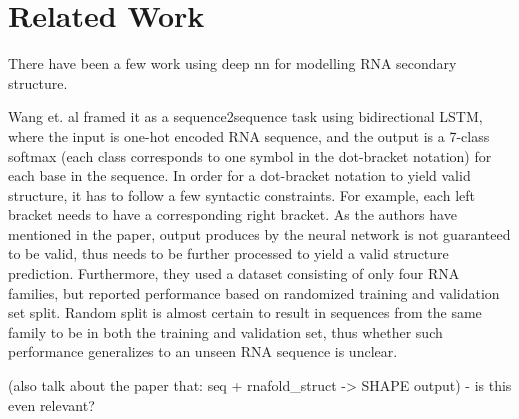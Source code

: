 \documentclass{article}
\begin{document}

\section{Related Work}

There have been a few work using deep nn for modelling RNA secondary structure.

Wang et. al\cite{wang2019dmfold} framed it as a sequence2sequence task using bidirectional LSTM,
where the input is one-hot encoded RNA sequence, and the output is a
7-class softmax (each class corresponds to one symbol in the dot-bracket notation) for each base in the sequence.
In order for a dot-bracket notation to yield valid structure, it has to follow a few syntactic constraints.
For example, each left bracket needs to have a corresponding right bracket.
As the authors have mentioned in the paper, output produces by the neural network
is not guaranteed to be valid, thus needs to be further processed to yield a valid structure prediction.
Furthermore, they used a dataset consisting of only four RNA families,
but reported performance based on randomized training and validation set split.
Random split is almost certain to result in sequences from the same family to be in both the training and validation set,
thus whether such performance generalizes to an unseen RNA sequence is unclear.

(also talk about the paper that: seq + rnafold_struct -> SHAPE output) - is this even relevant?

%
%
%
%

\end{document}
